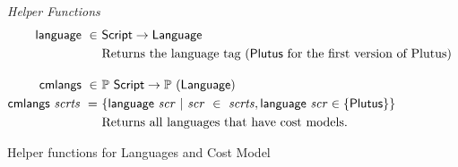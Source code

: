 \begin{figure*}[htb]
  \emph{Helper Functions}
  \begin{align*}
    \fun{language} ~\in~& \Script \to \Language \\
    &\text{Returns the language tag ($\Plutus$ for the first version of Plutus)}
    \nextdef
    \fun{cmlangs} ~\in~& \powerset{\Script} \to \powerset{(\Language)} \\
    \fun{cmlangs}~ \var{scrts} ~=~ & \{ \fun{language}~\var{scr} ~\vert~
      \var{scr}~\in~ \var{scrts}, \fun{language}~\var{scr} \in \{\Plutus\}  \}\\
    &\text{Returns all languages that have cost models.}
  \end{align*}
  \caption{Helper functions for Languages and Cost Model}
  \label{fig:defs:functions-chain-helper}
\end{figure*}


\clearpage
